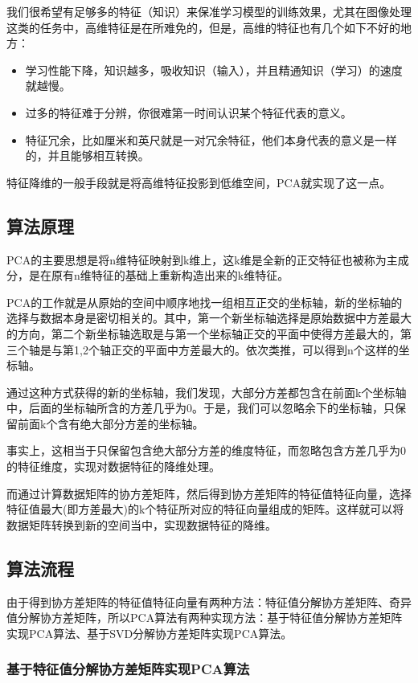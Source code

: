 \documentclass{ML}
\begin{document}
我们很希望有足够多的特征（知识）来保准学习模型的训练效果，尤其在图像处理这类的任务中，高维特征是在所难免的，但是，高维的特征也有几个如下不好的地方：

\begin{itemize}
	\item 学习性能下降，知识越多，吸收知识（输入），并且精通知识（学习）的速度就越慢。
	\item 过多的特征难于分辨，你很难第一时间认识某个特征代表的意义。
	\item 特征冗余，比如厘米和英尺就是一对冗余特征，他们本身代表的意义是一样的，并且能够相互转换。
\end{itemize}

特征降维的一般手段就是将高维特征投影到低维空间，PCA就实现了这一点。

\subsection{算法原理}

PCA的主要思想是将n维特征映射到k维上，这k维是全新的正交特征也被称为主成分，是在原有n维特征的基础上重新构造出来的k维特征。

PCA的工作就是从原始的空间中顺序地找一组相互正交的坐标轴，新的坐标轴的选择与数据本身是密切相关的。其中，第一个新坐标轴选择是原始数据中方差最大的方向，第二个新坐标轴选取是与第一个坐标轴正交的平面中使得方差最大的，第三个轴是与第1,2个轴正交的平面中方差最大的。依次类推，可以得到n个这样的坐标轴。

通过这种方式获得的新的坐标轴，我们发现，大部分方差都包含在前面k个坐标轴中，后面的坐标轴所含的方差几乎为0。于是，我们可以忽略余下的坐标轴，只保留前面k个含有绝大部分方差的坐标轴。

事实上，这相当于只保留包含绝大部分方差的维度特征，而忽略包含方差几乎为0的特征维度，实现对数据特征的降维处理。

而通过计算数据矩阵的协方差矩阵，然后得到协方差矩阵的特征值特征向量，选择特征值最大(即方差最大)的k个特征所对应的特征向量组成的矩阵。这样就可以将数据矩阵转换到新的空间当中，实现数据特征的降维。

\subsection{算法流程}

由于得到协方差矩阵的特征值特征向量有两种方法：特征值分解协方差矩阵、奇异值分解协方差矩阵，所以PCA算法有两种实现方法：基于特征值分解协方差矩阵实现PCA算法、基于SVD分解协方差矩阵实现PCA算法。

\subsubsection{基于特征值分解协方差矩阵实现PCA算法}
\end{document}
